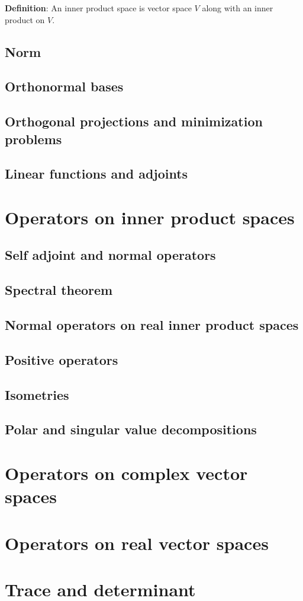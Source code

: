 \documentclass[a4paper, 10pt]{report}
\begin{document}
\begin{framed}
   \textbf{Definition}: An inner product space is vector space $V$ along with an inner product on $V$. 
\end{framed}



\section{Norm}
\section{Orthonormal bases}
\section{Orthogonal projections and minimization problems}
\section{Linear functions and adjoints}

\chapter{Operators on inner product spaces}
\section{Self adjoint and normal operators}
\section{Spectral theorem}
\section{Normal operators on real inner product spaces}
\section{Positive operators}
\section{Isometries}
\section{Polar and singular value decompositions}

\chapter{Operators on complex vector spaces}
\chapter{Operators on real vector spaces}
\chapter{Trace and determinant}
\end{document}
